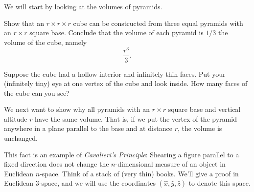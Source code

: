 \documentclass[newpage,hints,handout]{ximera}
\begin{document}
We will start by looking at the volumes of pyramids.

\begin{problem} Show that an $r\times r\times r$ cube can be constructed
from three equal pyramids with an $r\times r$ square base. Conclude
that the volume of each pyramid is $1/3$ the volume of the cube,
namely
\[
\frac{r^{3}}{3}.
\]

\begin{hint}
Suppose the cube had a hollow interior and infinitely thin
faces. Put your (infinitely tiny) eye at one vertex of the cube and
look inside. How many faces of the cube can you see?
\end{hint}

\begin{freeResponse}
\begin{image}
\end{image}
\end{freeResponse}
\end{problem}

We next want to show why all pyramids with an $r\times r$ square base
and vertical altitude $r$ have the same volume. That is, if we put the
vertex of the pyramid anywhere in a plane parallel to the base and at
distance $r$, the volume is unchanged.

This fact is an example of \textit{Cavalieri's Principle}: Shearing a
figure parallel to a fixed direction does not change the
$n$-dimensional measure of an object in Euclidean $n$-space. Think of
a stack of (very thin) books. We'll give a proof in Euclidean $3$-space,
and we will use the coordinates $(\hat{x},\hat{y},\hat{z})$ to denote
this space. 
\end{document}
